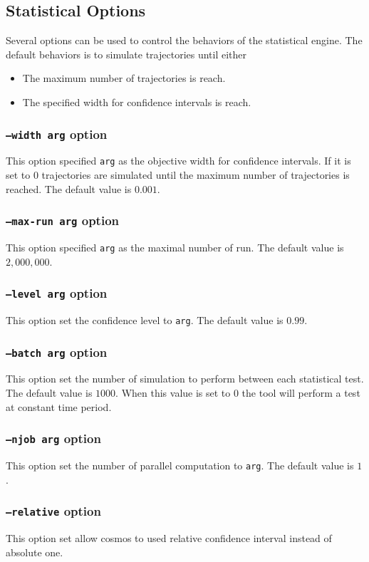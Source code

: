 \documentclass{article}
\begin{document}
\subsection{Statistical Options}
Several options can be used to control the behaviors of the statistical engine.
The default behaviors is to simulate trajectories until either
\begin{itemize}
\item The maximum number of trajectories is reach.
\item The specified width for confidence intervals is reach.
\end{itemize}

\subsubsection{\texttt{--width arg}  option}
This option specified \texttt{arg} as the objective width for
confidence intervals. If it is set to $0$ trajectories are
simulated until the maximum number of trajectories is reached.
The default value is $0.001$.

\subsubsection{\texttt{--max-run arg}  option}
This option specified \texttt{arg} as the maximal number of run.
The default value is $2,000,000$.

\subsubsection{\texttt{--level arg}  option}
This option set the confidence level to \texttt{arg}.
The default value is $0.99$.

\subsubsection{\texttt{--batch arg}  option}
This option set the number of simulation to perform between each
statistical test.  The default value is $1000$. When this value is 
set to $0$ the tool will perform a test at constant time period.

\subsubsection{\texttt{--njob arg}  option}
This option set the number of parallel computation to \texttt{arg}.
The default value is $1$.

\subsubsection{\texttt{--relative}  option}
This option set allow cosmos to used relative confidence interval
instead of absolute one.
\end{document}

